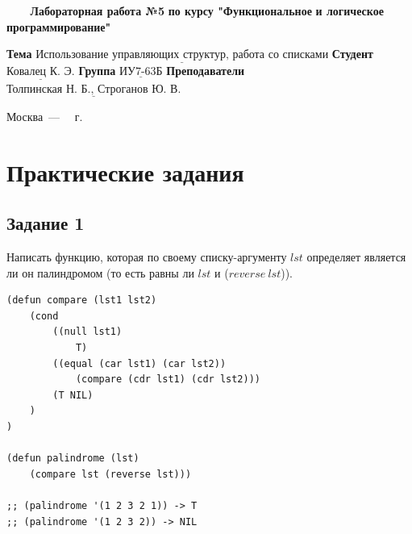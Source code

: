 \documentclass[a4paper,14pt, unknownkeysallowed]{extreport}
\begin{document}
\begin{titlepage}
	
	\begin{center}
		\noindent\begin{minipage}{1.3\textwidth}\centering
		\Large\textbf{   ~~~ Лабораторная работа №5}\newline
		\textbf{по курсу "Функциональное}\newline
		\textbf{и логическое программирование"}\newline\newline\newline
		\end{minipage}
	\end{center}
	
	\noindent\textbf{Тема} 			$\underline{\text{Использование управляющих структур, работа со списками}}$\newline\newline
	\noindent\textbf{Студент} 		$\underline{\text{Ковалец К. Э.}}$\newline\newline
	\noindent\textbf{Группа} 		$\underline{\text{ИУ7-63Б}}$\newline\newline
	\noindent\textbf{Преподаватели} $\underline{\text{Толпинская Н. Б., Строганов Ю. В.}}$\newline
	
	\begin{center}
		\vfill
		Москва~---~\the\year
		~г.
	\end{center}
	\restoregeometry
\end{titlepage}



\setcounter{page}{2}
\chapter{Практические задания}

\section{Задание 1}

Написать функцию, которая по своему списку-аргументу $lst$ определяет является ли он палиндромом (то есть равны ли $lst$ и ($reverse \ lst$)).

\begin{center}
\captionsetup{justification=raggedright,singlelinecheck=off}
\begin{lstlisting}[label=lst:parallel_processing,caption=Решение задания 1]
(defun compare (lst1 lst2)
    (cond 
        ((null lst1)
            T)
        ((equal (car lst1) (car lst2)) 
            (compare (cdr lst1) (cdr lst2)))
        (T NIL)
    )
)

(defun palindrome (lst)
    (compare lst (reverse lst)))

;; (palindrome '(1 2 3 2 1)) -> T
;; (palindrome '(1 2 3 2)) -> NIL
\end{lstlisting}
\end{center}
\end{document}
